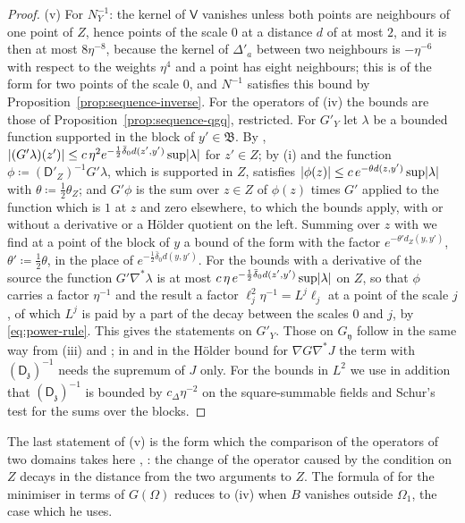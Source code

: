 \documentclass[11pt]{preprint}
\DeclarePairedDelimiter{\abs}{\lvert}{\rvert}
\numberwithin{equation}{section}
\theoremstyle{definition}
\theoremstyle{remark}
\theoremstyle{plain}
\begin{document}
\begin{proof}
(v) For $N_Y^{-1}$: the kernel of $\mathsf V$ vanishes unless both points are neighbours of one point of $Z$, hence points of the scale $0$ at a distance $d$ of at most $2$, and it is then at most $8\eta^{-8}$, because the kernel of $\Delta'_a$ between two neighbours is $-\eta^{-6}$ with respect to the weights $\eta^4$ and a point has eight neighbours; this is of the form \cite[(2.87)]{BalabanPRT2} for two points of the scale $0$, and $N^{-1}$ satisfies this bound by Proposition~\ref{prop:sequence-inverse}. For the operators of (iv) the bounds are those of Proposition~\ref{prop:sequence-qgq}, restricted. For $G'_Y$ let $\lambda$ be a bounded function supported in the block of $y' \in \mathfrak B$. By \cite[(2.67)]{BalabanPRT2}, $\abs{(G'\lambda)(z')} \leq c\,\eta^2e^{-\frac12\bar\delta_0d(z', y')}\sup\abs\lambda$ for $z' \in Z$; by (i) and \cite[(2.61)]{BalabanPRT2} the function $\phi \coloneqq (\mathsf D'_Z)^{-1}G'\lambda$, which is supported in $Z$, satisfies $\abs{\phi(z)} \leq c\,e^{-\theta d(z, y')}\sup\abs\lambda$ with $\theta \coloneqq \frac12\theta_Z$; and $G'\phi$ is the sum over $z \in Z$ of $\phi(z)$ times $G'$ applied to the function which is $1$ at $z$ and zero elsewhere, to which the bounds \cite[(2.67)]{BalabanPRT2} apply, with or without a derivative or a H\"older quotient on the left. Summing over $z$ with \cite[(2.61)]{BalabanPRT2} we find at a point of the block of $y$ a bound of the form \cite[(2.67)]{BalabanPRT2} with the factor $e^{-\theta'd_Z(y, y')}$, $\theta' \coloneqq \frac12\theta$, in the place of $e^{-\frac12\bar\delta_0d(y, y')}$. For the bounds with a derivative of the source the function $G'\nabla^*\lambda$ is at most $c\,\eta\,e^{-\frac12\bar\delta_0d(z', y')}\sup\abs\lambda$ on $Z$, so that $\phi$ carries a factor $\eta^{-1}$ and the result a factor $\ell_j^2\eta^{-1} = L^j\ell_j$ at a point of the scale $j$, of which $L^j$ is paid by a part of the decay between the scales $0$ and $j$, by \eqref{eq:power-rule}. This gives the statements on $G'_Y$. Those on $G_{\mathfrak y}$ follow in the same way from (iii) and \cite[(2.136)--(2.139)]{BalabanPRT2}; in \cite[(2.138)]{BalabanPRT2} and in the H\"older bound for $\nabla G\nabla^*J$ the term with $(\mathsf D_{\mathfrak z})^{-1}$ needs the supremum of $J$ only. For the bounds \cite[(2.140)]{BalabanPRT2} in $L^2$ we use in addition that $(\mathsf D_{\mathfrak z})^{-1}$ is bounded by $c_\Delta\eta^{-2}$ on the square-summable fields and Schur's test for the sums over the blocks.
\end{proof}

The last statement of (v) is the form which the comparison of the operators of two domains takes here \cite[(1.11), (1.12)]{BalabanRDG}, \cite[Theorem~3.14]{BalabanPBG}: the change of the operator caused by the condition on $Z$ decays in the distance from the two arguments to $Z$. The formula of \cite[p.~228]{BalabanPRT2} for the minimiser in terms of $G(\Omega)$ reduces to (iv) when $B$ vanishes outside $\Omega_1$, the case which he uses.
\end{document}
